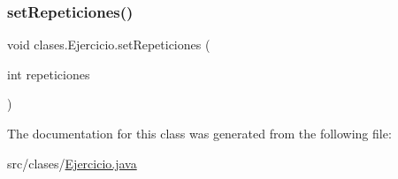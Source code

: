 \mbox{\label{classclases_1_1_ejercicio_a032a5a0dfdf535d16a584965b9844694}} 
\subsubsection{\texorpdfstring{set\+Repeticiones()}{setRepeticiones()}}
{\footnotesize\ttfamily void clases.\+Ejercicio.\+set\+Repeticiones (\begin{DoxyParamCaption}\item[{int}]{repeticiones }\end{DoxyParamCaption})}



The documentation for this class was generated from the following file\+:\begin{DoxyCompactItemize}
\item 
src/clases/\mbox{\hyperlink{_ejercicio_8java}{Ejercicio.\+java}}\end{DoxyCompactItemize}
